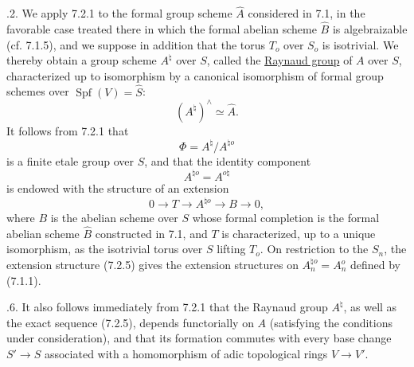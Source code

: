 
\medskip
{}.2. We apply 7.2.1 to the formal group scheme $\widehat A$
considered in 7.1, in the favorable case treated there in which the
formal abelian scheme $\widehat B$ is algebraizable (cf. 7.1.5), and
we suppose in addition that the torus $T_o$ over $S_o$ is isotrivial.
We thereby obtain a group scheme $A^\natural$ over $S$, called the
\underline{Raynaud group} of $A$ over $S$, characterized up to
isomorphism by a canonical isomorphism of formal group schemes over
$\operatorname{Spf}(V)=\widehat S$:
\begin{equation}\tag{7.2.3}
 (A^\natural)^\wedge\simeq\widehat A.
\end{equation}
It follows from 7.2.1 that
\begin{equation}\tag{7.2.4}
 \Phi=A^\natural/A^{\natural o}
\end{equation}
is a finite etale group over $S$, and that the identity component
\[
 A^{\natural o}=A^{o\natural}
\]
is endowed with the structure of an extension
\begin{equation}\tag{7.2.5}
 0\longrightarrow T\longrightarrow A^{\natural o}
 \longrightarrow B\longrightarrow0,
\end{equation}
where $B$ is the abelian scheme over $S$ whose formal completion is
the formal abelian scheme $\widehat B$ constructed in 7.1, and $T$ is
characterized, up to a unique isomorphism, as the isotrivial torus
over $S$ lifting $T_o$.  On restriction to the $S_n$, the extension
structure (7.2.5) gives the extension structures on
$A_n^{\natural o}=A_n^o$ defined by (7.1.1).

\medskip
{}.6. It also follows immediately from 7.2.1 that the Raynaud group
$A^\natural$, as well as the exact sequence (7.2.5), depends
functorially on $A$ (satisfying the conditions under consideration),
and that its formation commutes with every base change
$S'\longrightarrow S$ associated with a homomorphism of adic
topological rings $V\longrightarrow V'$.
